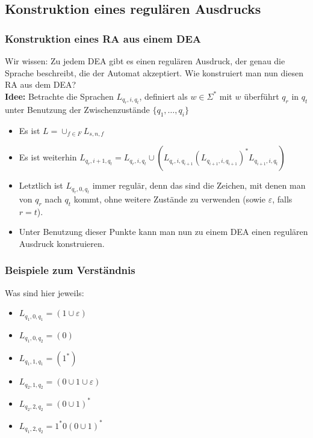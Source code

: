 \subsection{Konstruktion eines regulären Ausdrucks}
\begin{frame}
\frametitle{Konstruktion eines RA aus einem DEA}
Wir wissen: Zu jedem DEA gibt es einen regulären Ausdruck, der genau die Sprache beschreibt, die der Automat akzeptiert. Wie konstruiert man nun diesen RA aus dem DEA?\\[0.6cm]
\textbf{Idee:} Betrachte die Sprachen $L_{q_r,i,q_t}$, definiert als \( w \in \Sigma^*\) mit $w$ überführt $q_r$ in $q_t$ unter Benutzung der Zwischenzustände $\{q_1,\ldots,q_i\}$
\begin{itemize}
\item Es ist $L = \cup_{f\in F} L_{s,n,f}$
\item Es ist weiterhin $L_{q_r,i+1,q_t} = L_{q_r,i,q_t} \cup (L_{q_r,i,q_{i+1}}(L_{q_{i+1},i,q_{i+1}})^*L_{q_{i+1},i,q_t})$
\item Letztlich ist $L_{q_r, 0, q_t}$ immer regulär, denn das sind die Zeichen, mit denen man von $q_r$ nach $q_t$ kommt, ohne weitere Zustände zu verwenden (sowie $\varepsilon$, falls $r = t$).
\item Unter Benutzung dieser Punkte kann man nun zu einem DEA einen regulären Ausdruck konstruieren.
\end{itemize}
\end{frame}


\begin{frame}
\frametitle{Beispiele zum Verständnis}
\begin{figure}[H]
\begin{center}
\end{center}
\end{figure}

Was sind hier jeweils:

\begin{itemize}
\item $L_{q_1,0,q_1}$\pause $ = (1\cup\varepsilon)$
\item $L_{q_1,0,q_2}$\pause $ = (0)$
\item $L_{q_1,1,q_1}$\pause $ = (1^*)$
\item $L_{q_2,1,q_2}$\pause $ = (0\cup1\cup\varepsilon)$
\item $L_{q_2,2,q_2}$\pause $ = (0\cup1)^*$
\item $L_{q_1,2,q_2}$\pause $ = 1^*0(0\cup1)^*$
\end{itemize}
\end{frame}

